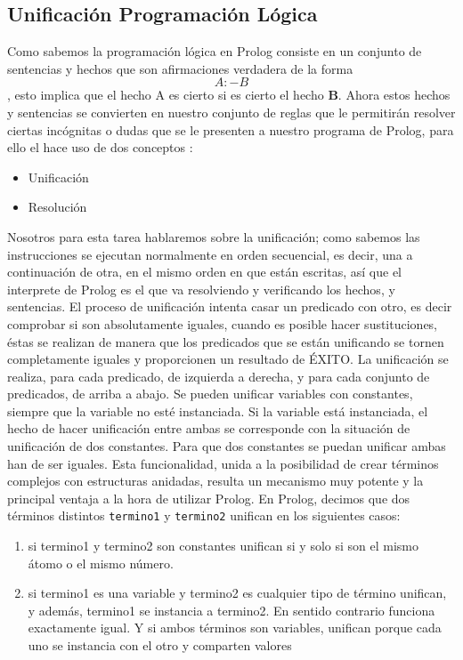 \documentclass[paper=a4, fontsize=12pt]{article} 		%
\numberwithin{equation}{section}						%
\numberwithin{table}{section} 							%
\begin{document}
\subsection{Unificación Programación Lógica}
Como sabemos la programación lógica en Prolog consiste en un conjunto de sentencias y hechos que son afirmaciones verdadera de la forma$$A:- B $$, esto implica que el hecho A es cierto si es cierto el  hecho \textbf{B}. Ahora estos hechos y sentencias se convierten en nuestro conjunto de reglas que le permitirán resolver ciertas incógnitas o dudas que se le presenten  a nuestro programa de Prolog, para ello el hace uso de dos conceptos :
\begin{itemize}
\item Unificación
\item Resolución
\end{itemize}
Nosotros para esta tarea hablaremos sobre la unificación; como sabemos las instrucciones se ejecutan normalmente en orden secuencial, es decir, una a continuación de otra, en el mismo orden en que están escritas, así que el interprete de Prolog es el que va resolviendo y verificando los hechos, y sentencias.
El proceso de unificación intenta casar un predicado con otro, es decir comprobar si son absolutamente iguales, cuando es posible hacer sustituciones, éstas se realizan de manera que los predicados que se están unificando se tornen completamente iguales y proporcionen un resultado de ÉXITO. La unificación se realiza, para cada predicado, de izquierda a derecha, y para cada conjunto de predicados, de arriba a abajo. Se pueden unificar variables con constantes, siempre que la variable no esté instanciada. Si la variable está instanciada, el hecho de hacer unificación entre ambas se corresponde con la situación de unificación de dos constantes. Para que dos constantes se puedan unificar ambas han de ser iguales.
Esta funcionalidad, unida a la posibilidad de crear términos complejos con estructuras anidadas, resulta un mecanismo muy potente y la principal ventaja a la hora de utilizar Prolog. En Prolog, decimos que dos términos distintos \texttt{termino1} y \texttt{termino2} unifican en los siguientes casos:
\begin{enumerate}
\item si termino1 y termino2 son constantes unifican si y solo si son el  mismo átomo o el mismo número.
\item si termino1 es una variable y termino2 es cualquier tipo de término unifican, y además, termino1 se instancia a termino2. En sentido contrario funciona exactamente igual. Y si ambos términos son variables, unifican porque cada uno se instancia con el otro y comparten valores
\end{enumerate}
\end{document}
